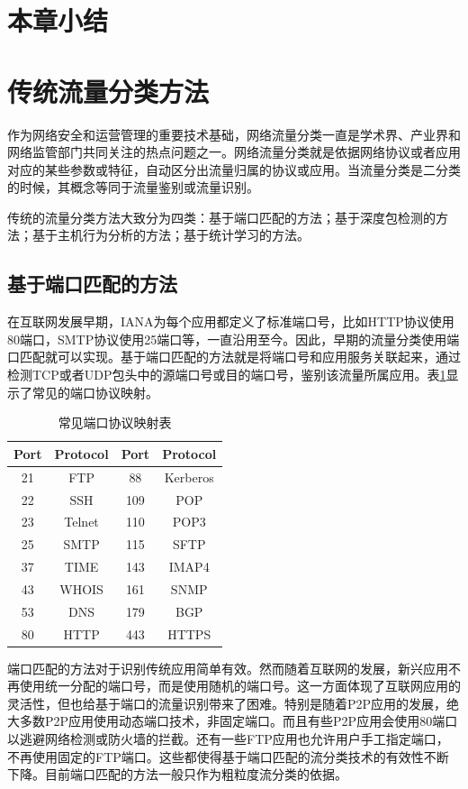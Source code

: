 \section{本章小结}


\section{传统流量分类方法}
作为网络安全和运营管理的重要技术基础，网络流量分类一直是学术界、产业界和网络监管部门共同关注的热点问题之一。网络流量分类就是依据网络协议或者应用对应的某些参数或特征，自动区分出流量归属的协议或应用。当流量分类是二分类的时候，其概念等同于流量鉴别或流量识别。

传统的流量分类方法大致分为四类：基于端口匹配的方法；基于深度包检测的方法；基于主机行为分析的方法；基于统计学习的方法。
\subsection{基于端口匹配的方法}
在互联网发展早期，IANA为每个应用都定义了标准端口号，比如HTTP协议使用80端口，SMTP协议使用25端口等，一直沿用至今。因此，早期的流量分类使用端口匹配就可以实现。基于端口匹配的方法就是将端口号和应用服务关联起来，通过检测TCP或者UDP包头中的源端口号或目的端口号，鉴别该流量所属应用。表\ref{tab:21}显示了常见的端口协议映射。
\begin{table} [thb]
\caption{常见端口协议映射表}\label{tab:21}
\small
\centering
{
\begin{tabular}{cccc}
  \toprule
        Port & Protocol & Port & Protocol\\
  \midrule
        21 & FTP & 88 & Kerberos\\
        22 & SSH & 109 & POP\\
        23 & Telnet & 110 & POP3\\
        25 & SMTP & 115 & SFTP\\
        37 & TIME & 143 & IMAP4\\
        43 & WHOIS & 161 & SNMP\\
        53 & DNS & 179 & BGP\\
        80 & HTTP & 443 & HTTPS\\

 \bottomrule
\end{tabular}
}
\end{table}

端口匹配的方法对于识别传统应用简单有效。然而随着互联网的发展，新兴应用不再使用统一分配的端口号，而是使用随机的端口号。这一方面体现了互联网应用的灵活性，但也给基于端口的流量识别带来了困难。特别是随着P2P应用的发展，绝大多数P2P应用使用动态端口技术，非固定端口。而且有些P2P应用会使用80端口以逃避网络检测或防火墙的拦截。还有一些FTP应用也允许用户手工指定端口，不再使用固定的FTP端口。这些都使得基于端口匹配的流分类技术的有效性不断下降。目前端口匹配的方法一般只作为粗粒度流分类的依据。
